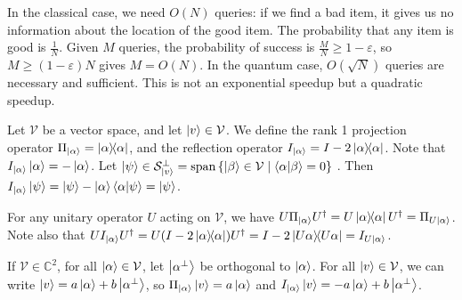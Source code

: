 In the classical case, we need \( O(N) \) queries: if we find a bad item, it gives us no information about the location of the good item.
The probability that any item is good is \( \frac{1}{N} \).
Given \( M \) queries, the probability of success is \( \frac{M}{N} \geq 1 - \varepsilon \), so \( M \geq (1-\varepsilon)N \) gives \( M = O(N) \).
In the quantum case, \( O(\sqrt{N}) \) queries are necessary and sufficient.
This is not an exponential speedup but a quadratic speedup.

Let \( \mathcal V \) be a vector space, and let \( \ket{v} \in \mathcal V \).
We define the rank 1 projection operator \( \Pi_{\ket{\alpha}} = \op{\alpha}{\alpha} \), and the reflection operator \( I_{\ket{\alpha}} = I - 2 \op{\alpha}{\alpha} \).
Note that \( I_{\ket{\alpha}} \ket{\alpha} = - \ket{\alpha} \).
Let \( \ket{\psi} \in \mathcal S_{\ket{v}}^\perp = \vecspan\qty{\ket{\beta} \in \mathcal V \mid \ip{\alpha}{\beta} = 0} \) .
Then \( I_{\ket{\alpha}} \ket{\psi} = \ket{\psi} - \ket{\alpha}\ip{\alpha}{\psi} = \ket{\psi} \).

For any unitary operator \( U \) acting on \( \mathcal V \), we have \( U \Pi_{\ket{\alpha}} U^\dagger = U \op{\alpha}{\alpha} U^\dagger = \Pi_{U\ket{\alpha}} \).
Note also that \( U I_{\ket{\alpha}} U^\dagger = U(I - 2 \op{\alpha}{\alpha}) U^\dagger = I - 2 \op{U\alpha}{U\alpha} = I_{U\ket{\alpha}} \).

If \( \mathcal V \in \mathbb C^2 \), for all \( \ket{\alpha} \in \mathcal V \), let \( \ket{\alpha^\perp} \) be orthogonal to \( \ket{\alpha} \).
For all \( \ket{v} \in \mathcal V \), we can write \( \ket{v} = a \ket{\alpha} + b \ket{\alpha^\perp} \), so \( \Pi_{\ket{\alpha}} \ket{v} = a \ket{\alpha} \) and \( I_{\ket{\alpha}} \ket{v} = -a\ket{\alpha} + b \ket{\alpha^\perp} \).

